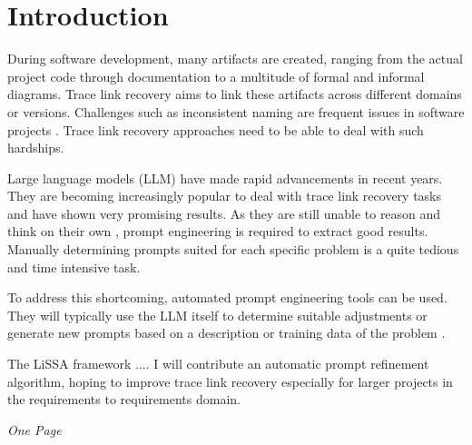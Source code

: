 
\chapter{Introduction}
\label{ch:Introduction}
During software development, many artifacts are created, ranging from the actual project code through documentation to a multitude of formal and informal diagrams. Trace link recovery aims to link these artifacts across different domains or versions. Challenges such as inconsistent naming are frequent issues in software projects \cite{wohlrab2019ImprovingConsistency}. Trace link recovery approaches need to be able to deal with such hardships. 

Large language models (LLM) have made rapid advancements in recent years. They are becoming increasingly popular to deal with trace link recovery tasks and have shown very promising results. As they are still unable to reason and think on their own \cite{shojaee2025IllusionThinking}, prompt engineering is required to extract good results. Manually determining prompts suited for each specific problem is a quite tedious and time intensive task. 

To address this shortcoming, automated prompt engineering tools can be used. They will typically use the LLM itself to determine suitable adjustments or generate new prompts based on a description or training data of the problem \cite{ramnath2025SystematicSurvey}.

The LiSSA framework \cite{fuchss2025LiSSAGeneric} ....
I will contribute an automatic prompt refinement algorithm, hoping to improve trace link recovery especially for larger projects in the requirements to requirements domain.

\textit{One Page}